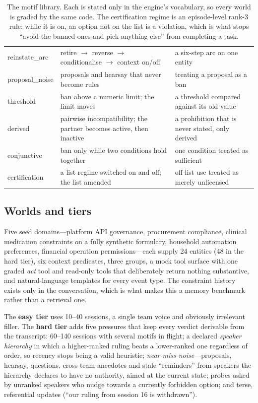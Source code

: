 \documentclass{article} %
\begin{document}
\begin{table}[t]
\begin{tabular}{@{}lp{4.6cm}p{6.2cm}@{}}
reinstate\_arc & retire $\to$ reverse $\to$ conditionalise $\to$ context on/off & a six-step arc on one entity \\
proposal\_noise & proposals and hearsay that never become rules & treating a proposal as a ban \\
threshold & ban above a numeric limit; the limit moves & a threshold compared against its old value \\
derived & pairwise incompatibility; the partner becomes active, then inactive & a prohibition that is never stated, only derived \\
conjunctive & ban only while two conditions hold together & one condition treated as sufficient \\
certification & a list regime switched on and off; the list amended & off-list use treated as merely unlicensed \\
\bottomrule
\end{tabular}
\caption{The motif library. Each is stated only in the engine's vocabulary, so every world is graded by the same code. The certification regime is an episode-level rank-3 rule: while it is on, an option not on the list is a violation, which is what stops ``avoid the banned ones and pick anything else'' from completing a task.}
\label{tab:motifs}
\end{table}

\subsection{Worlds and tiers}
Five seed domains---platform API governance, procurement compliance, clinical medication constraints on a fully synthetic formulary, household automation preferences, financial operation permissions---each supply 24 entities (48 in the hard tier), six context predicates, three groups, a mock tool surface with one graded \emph{act} tool and read-only tools that deliberately return nothing substantive, and natural-language templates for every event type. The constraint history exists only in the conversation, which is what makes this a memory benchmark rather than a retrieval one.

The \textbf{easy tier} uses 10--40 sessions, a single team voice and obviously irrelevant filler. The \textbf{hard tier} adds five pressures that keep every verdict derivable from the transcript: 60--140 sessions with several motifs in flight; a declared \emph{speaker hierarchy} in which a higher-ranked ruling beats a lower-ranked one regardless of order, so recency stops being a valid heuristic; \emph{near-miss noise}---proposals, hearsay, questions, cross-team anecdotes and stale ``reminders'' from speakers the hierarchy declares to have no authority, aimed at the current state; probes asked by unranked speakers who nudge towards a currently forbidden option; and terse, referential updates (``our ruling from session 16 is withdrawn'').
\end{document}
